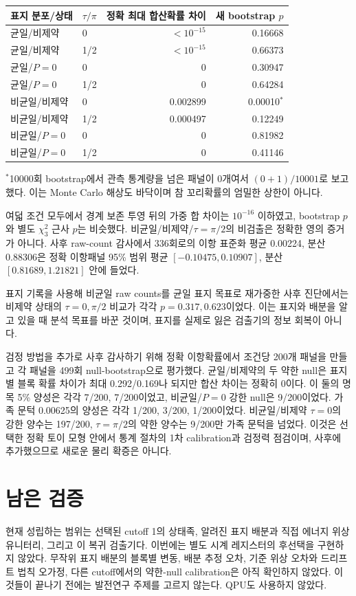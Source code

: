 \documentclass[11pt,a4paper]{article}
\begin{document}
\begin{center}
\begin{tabular}{@{}llrr@{}}
\toprule
표지 분포/상태 & $\tau/\pi$ & 정확 최대 합산확률 차이 & 새 bootstrap $p$ \\
\midrule
균일/비제약 & 0 & $<10^{-15}$ & 0.16668 \\
균일/비제약 & 1/2 & $<10^{-15}$ & 0.66373 \\
균일/$P=0$ & 0 & 0 & 0.30947 \\
균일/$P=0$ & 1/2 & 0 & 0.64284 \\
비균일/비제약 & 0 & 0.002899 & 0.00010$^{*}$ \\
비균일/비제약 & 1/2 & 0.000497 & 0.12249 \\
비균일/$P=0$ & 0 & 0 & 0.81982 \\
비균일/$P=0$ & 1/2 & 0 & 0.41146 \\
\bottomrule
\end{tabular}
\end{center}

$^{*}$10000회 bootstrap에서 관측 통계량을 넘은 패널이 0개여서
$(0+1)/10001$로 보고했다. 이는 Monte Carlo 해상도 바닥이며
참 꼬리확률의 엄밀한 상한이 아니다.

여덟 조건 모두에서 경계 보존 투영 뒤의 가중 합 차이는
$10^{-16}$ 이하였고, bootstrap $p$와 별도 $\chi^2_3$
근사 $p$는 비슷했다. 비균일/비제약/$\tau=\pi/2$의
비검출은 정확한 영의 증거가 아니다. 사후 raw-count 감사에서
336회로의 이항 표준화 평균 0.00224, 분산 0.88306은
정확 이항패널 95\% 범위 평균 $[-0.10475,0.10907]$,
분산 $[0.81689,1.21821]$ 안에 들었다.

표지 기록을 사용해 비균일 raw counts를 균일 표지 목표로
재가중한 사후 진단에서는 비제약 상태의 $\tau=0,\pi/2$
비교가 각각 $p=0.317,0.623$이었다. 이는 표지와 배분을
알고 있을 때 분석 목표를 바꾼 것이며, 표지를 실제로 잃은
검출기의 정보 회복이 아니다.

검정 방법을 추가로 사후 감사하기 위해 정확 이항확률에서
조건당 200개 패널을 만들고 각 패널을 499회 null-bootstrap으로
평가했다. 균일/비제약의 두 약한 null은 표지별 블록 확률 차이가
최대 0.292/0.169나 되지만 합산 차이는 정확히 0이다.
이 둘의 명목 5\% 양성은 각각 7/200, 7/200이었고,
비균일/$P=0$ 강한 null은 9/200이었다. 가족 문턱
0.00625의 양성은 각각 1/200, 3/200, 1/200이었다.
비균일/비제약 $\tau=0$의 강한 양수는 197/200,
$\tau=\pi/2$의 약한 양수는 9/200만 가족 문턱을 넘었다.
이것은 선택한 정확 토이 모형 안에서 통계 절차의 1차 calibration과
검정력 점검이며, 사후에 추가했으므로 새로운 물리 확증은 아니다.

\section{남은 검증}
현재 성립하는 범위는 선택된 cutoff 1의 상태족, 알려진 표지
배분과 직접 에너지 위상 유니터리, 그리고 이 복귀 검출기다.
이번에는 별도 시계 레지스터의 후선택을 구현하지 않았다.
무작위 표지 배분의 블록별 변동, 배분 추정 오차, 기준 위상
오차와 드리프트 법칙 오가정, 다른 cutoff에서의 약한-null
calibration은 아직 확인하지 않았다. 이것들이 끝나기 전에는
발전연구 주제를 고르지 않는다. QPU도 사용하지 않았다.
\end{document}
